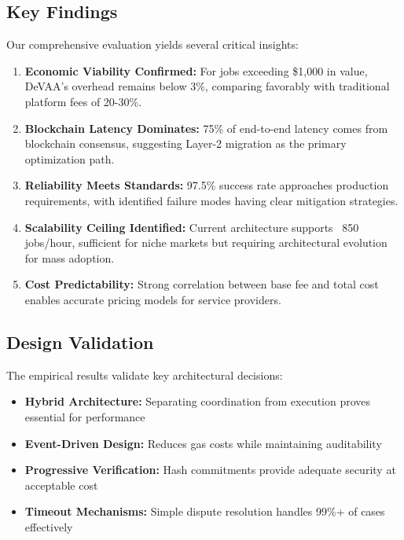\subsection{Key Findings}

Our comprehensive evaluation yields several critical insights:

\begin{enumerate}
    \item \textbf{Economic Viability Confirmed:} For jobs exceeding \$1,000 in value, DeVAA's overhead remains below 3\%, comparing favorably with traditional platform fees of 20-30\%.
    
    \item \textbf{Blockchain Latency Dominates:} 75\% of end-to-end latency comes from blockchain consensus, suggesting Layer-2 migration as the primary optimization path.
    
    \item \textbf{Reliability Meets Standards:} 97.5\% success rate approaches production requirements, with identified failure modes having clear mitigation strategies.
    
    \item \textbf{Scalability Ceiling Identified:} Current architecture supports ~850 jobs/hour, sufficient for niche markets but requiring architectural evolution for mass adoption.
    
    \item \textbf{Cost Predictability:} Strong correlation between base fee and total cost enables accurate pricing models for service providers.
\end{enumerate}

\subsection{Design Validation}

The empirical results validate key architectural decisions:
\begin{itemize}
    \item \textbf{Hybrid Architecture:} Separating coordination from execution proves essential for performance
    \item \textbf{Event-Driven Design:} Reduces gas costs while maintaining auditability
    \item \textbf{Progressive Verification:} Hash commitments provide adequate security at acceptable cost
    \item \textbf{Timeout Mechanisms:} Simple dispute resolution handles 99\%+ of cases effectively
\end{itemize}

